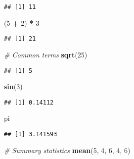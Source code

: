 \documentclass[
]{article}
\newenvironment{Shaded}{\begin{snugshade}}{\end{snugshade}}
\newcommand{\CommentTok}[1]{\textcolor[rgb]{0.56,0.35,0.01}{\textit{#1}}}
\newcommand{\DecValTok}[1]{\textcolor[rgb]{0.00,0.00,0.81}{#1}}
\newcommand{\KeywordTok}[1]{\textcolor[rgb]{0.13,0.29,0.53}{\textbf{#1}}}
\newcommand{\NormalTok}[1]{#1}
\newcommand{\OperatorTok}[1]{\textcolor[rgb]{0.81,0.36,0.00}{\textbf{#1}}}
\newcommand{\StringTok}[1]{\textcolor[rgb]{0.31,0.60,0.02}{#1}}
\begin{document}
\begin{verbatim}
## [1] 11
\end{verbatim}

\begin{Shaded}
\begin{Highlighting}[]
\NormalTok{(}\DecValTok{5} \OperatorTok{+}\StringTok{ }\DecValTok{2}\NormalTok{) }\OperatorTok{*}\StringTok{ }\DecValTok{3}
\end{Highlighting}
\end{Shaded}

\begin{verbatim}
## [1] 21
\end{verbatim}

\begin{Shaded}
\begin{Highlighting}[]
\CommentTok{# Common terms}
\KeywordTok{sqrt}\NormalTok{(}\DecValTok{25}\NormalTok{)}
\end{Highlighting}
\end{Shaded}

\begin{verbatim}
## [1] 5
\end{verbatim}

\begin{Shaded}
\begin{Highlighting}[]
\KeywordTok{sin}\NormalTok{(}\DecValTok{3}\NormalTok{)}
\end{Highlighting}
\end{Shaded}

\begin{verbatim}
## [1] 0.14112
\end{verbatim}

\begin{Shaded}
\begin{Highlighting}[]
\NormalTok{pi}
\end{Highlighting}
\end{Shaded}

\begin{verbatim}
## [1] 3.141593
\end{verbatim}

\begin{Shaded}
\begin{Highlighting}[]
\CommentTok{# Summary statistics}
\KeywordTok{mean}\NormalTok{(}\DecValTok{5}\NormalTok{, }\DecValTok{4}\NormalTok{, }\DecValTok{6}\NormalTok{, }\DecValTok{4}\NormalTok{, }\DecValTok{6}\NormalTok{)}
\end{Highlighting}
\end{Shaded}
\end{document}

